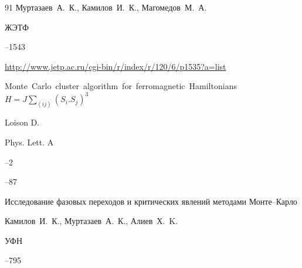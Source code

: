 \begin{thebibliography}{91}
\by    Муртазаев~А.~К., Камилов~И.~К., Магомедов~М.~А.

\jour ЖЭТФ




--1543

\elink \url{http://www.jetp.ac.ru/cgi-bin/r/index/r/120/6/p1535?a=list}




\paper   \mbox{Monte Carlo cluster algorithm for ferromagnetic Hamiltonians $H{=}J\! \sum_{(\!ij\!)}\!(\!S_i. S_j\!)^3$}

\by Loison D.

\jour Phys. Lett. A



--2

--87





\paper Исследование фазовых переходов и критических явлений методами Монте--Карло

\by    Камилов~И.~К., Муртазаев~А.~К., Алиев~Х.~K.

\jour УФН




--795





\end{thebibliography}



\RuDate










\makeentitle









